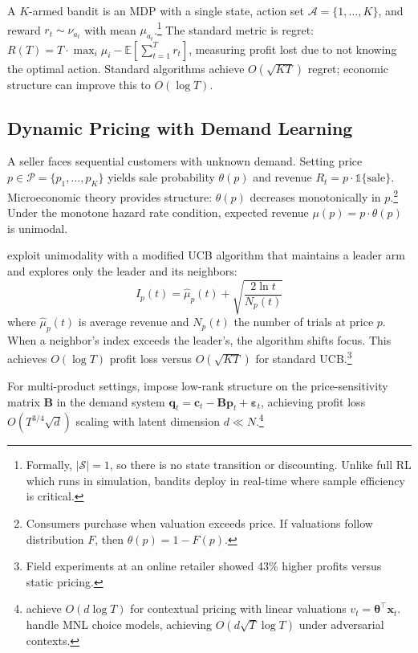 
A $K$-armed bandit is an MDP with a single state, action set $\mathcal{A} = \{1, \ldots, K\}$, and reward $r_t \sim \nu_{a_t}$ with mean $\mu_{a_t}$.\footnote{Formally, $|\mathcal{S}| = 1$, so there is no state transition or discounting. Unlike full RL which runs in simulation, bandits deploy in real-time where sample efficiency is critical.} The standard metric is regret: $R(T) = T \cdot \max_i \mu_i - \mathbb{E}[\sum_{t=1}^T r_t]$, measuring profit lost due to not knowing the optimal action. Standard algorithms achieve $O(\sqrt{KT})$ regret; economic structure can improve this to $O(\log T)$.

\subsection{Dynamic Pricing with Demand Learning}

A seller faces sequential customers with unknown demand. Setting price $p \in \mathcal{P} = \{p_1, \ldots, p_K\}$ yields sale probability $\theta(p)$ and revenue $R_t = p \cdot \mathbb{1}\{\text{sale}\}$. Microeconomic theory provides structure: $\theta(p)$ decreases monotonically in $p$.\footnote{Consumers purchase when valuation exceeds price. If valuations follow distribution $F$, then $\theta(p) = 1 - F(p)$.} Under the monotone hazard rate condition, expected revenue $\mu(p) = p \cdot \theta(p)$ is unimodal.

\citet{Misra2019} exploit unimodality with a modified UCB algorithm that maintains a leader arm and explores only the leader and its neighbors:
\begin{equation}
I_p(t) = \hat{\mu}_p(t) + \sqrt{\frac{2\ln t}{N_p(t)}}
\end{equation}
where $\hat{\mu}_p(t)$ is average revenue and $N_p(t)$ the number of trials at price $p$. When a neighbor's index exceeds the leader's, the algorithm shifts focus. This achieves $O(\log T)$ profit loss versus $O(\sqrt{KT})$ for standard UCB.\footnote{Field experiments at an online retailer showed 43\% higher profits versus static pricing.}

For multi-product settings, \citet{Mueller2019} impose low-rank structure on the price-sensitivity matrix $\mathbf{B}$ in the demand system $\mathbf{q}_t = \mathbf{c}_t - \mathbf{B}\mathbf{p}_t + \boldsymbol{\varepsilon}_t$, achieving profit loss $O(T^{3/4}\sqrt{d})$ scaling with latent dimension $d \ll N$.\footnote{\citet{Xu2021} achieve $O(d \log T)$ for contextual pricing with linear valuations $v_t = \boldsymbol{\theta}^\top \mathbf{x}_t$. \citet{Goyal2022} handle MNL choice models, achieving $O(d\sqrt{T}\log T)$ under adversarial contexts.}

